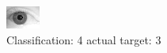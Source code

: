 \begin{figure}[h!]
\begin{center}
\includegraphics[width=0.60\columnwidth]{figures/ID2136_class_4_target_3.png}
\end{center}
\caption{ Classification: 4 actual target: 3}
\label{fig:ID2136_class_4_target_3}
\end{figure}
